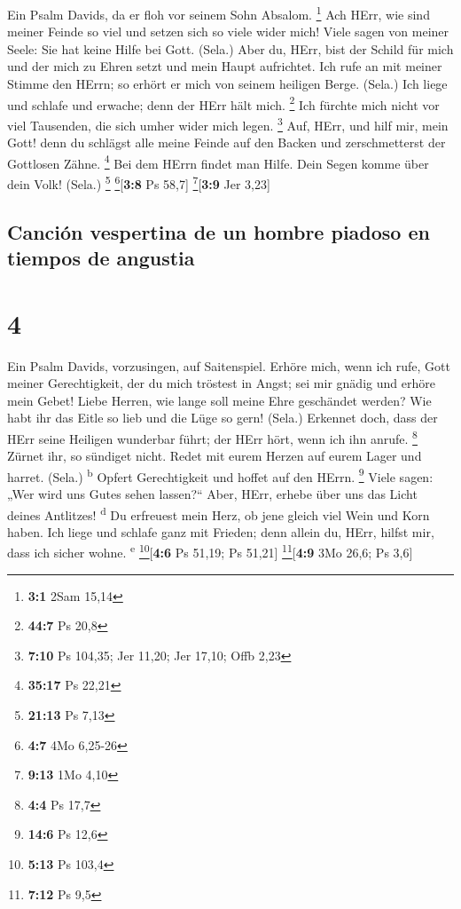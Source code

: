  Ein Psalm Davids, da er floh vor seinem Sohn Absalom.
\footnote{\textbf{3:1} 2Sam 15,14}  Ach HErr, wie sind
meiner Feinde so viel und setzen sich so viele wider mich!
 Viele sagen von meiner Seele: Sie hat keine Hilfe bei
Gott. (Sela.)  Aber du, HErr, bist der Schild für mich und
der mich zu Ehren setzt und mein Haupt aufrichtet.  Ich
rufe an mit meiner Stimme den HErrn; so erhört er mich von seinem
heiligen Berge. (Sela.)  Ich liege und schlafe und
erwache; denn der HErr hält mich. \footnote{\textbf{44:7} Ps 20,8}
 Ich fürchte mich nicht vor viel Tausenden, die sich umher
wider mich legen. \footnote{\textbf{7:10} Ps 104,35; Jer 11,20; Jer
  17,10; Offb 2,23}  Auf, HErr, und hilf mir, mein Gott!
denn du schlägst alle meine Feinde auf den Backen und zerschmetterst der
Gottlosen Zähne. \footnote{\textbf{35:17} Ps 22,21}  Bei
dem HErrn findet man Hilfe. Dein Segen komme über dein Volk! (Sela.)
\footnote{\textbf{21:13} Ps 7,13} \footnote{\textbf{4:7} 4Mo 6,25-26}{[}\textbf{3:8}
Ps 58,7{]} \footnote{\textbf{9:13} 1Mo 4,10}{[}\textbf{3:9} Jer 3,23{]}

\hypertarget{canciuxf3n-vespertina-de-un-hombre-piadoso-en-tiempos-de-angustia}{%
\subsection{Canción vespertina de un hombre piadoso en tiempos de
angustia}\label{canciuxf3n-vespertina-de-un-hombre-piadoso-en-tiempos-de-angustia}}

\hypertarget{section-3}{%
\section{4}\label{section-3}}

 Ein Psalm Davids, vorzusingen, auf Saitenspiel.
 Erhöre mich, wenn ich rufe, Gott meiner Gerechtigkeit,
der du mich tröstest in Angst; sei mir gnädig und erhöre mein Gebet!
 Liebe Herren, wie lange soll meine Ehre geschändet
werden? Wie habt ihr das Eitle so lieb und die Lüge so gern! (Sela.)
 Erkennet doch, dass der HErr seine Heiligen wunderbar
führt; der HErr hört, wenn ich ihn anrufe. \footnote{\textbf{4:4} Ps
  17,7}  Zürnet ihr, so sündiget nicht. Redet mit eurem
Herzen auf eurem Lager und harret. (Sela.) \textsuperscript{b}
 Opfert Gerechtigkeit und hoffet auf den HErrn.
\footnote{\textbf{14:6} Ps 12,6}  Viele sagen: „Wer wird
uns Gutes sehen lassen?{}`` Aber, HErr, erhebe über uns das Licht deines
Antlitzes! \textsuperscript{d}  Du erfreuest mein Herz, ob
jene gleich viel Wein und Korn haben.  Ich liege und
schlafe ganz mit Frieden; denn allein du, HErr, hilfst mir, dass ich
sicher wohne. \textsuperscript{e} \footnote{\textbf{5:13} Ps 103,4}{[}\textbf{4:6}
Ps 51,19; Ps 51,21{]} \footnote{\textbf{7:12} Ps 9,5}{[}\textbf{4:9} 3Mo
26,6; Ps 3,6{]}

